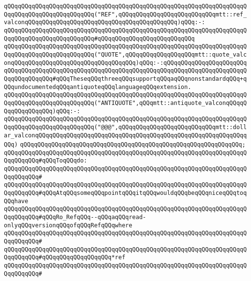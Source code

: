 \verb|qQQqqQQqqQQqqQQqqQQqqQQqqQQqqQQqqQQqqQQqqQQqqQQqqQQqqQQqqQQqqQQqqQQqqQQqqQQqqQQqqQQqqQQqqQQqqQQq("REF",qQQqqQQqqQQqqQQqqQQqqQQqqQQqmtt::ref_valconqQQqqQQqqQQqqQQqqQQqqQQqqQQqqQQqqQQqqQQqqQQq)qQQq:-:|\newline
\verb|qQQqqQQqqQQqqQQqqQQqqQQqqQQqqQQqqQQqqQQqqQQqqQQqqQQqqQQqqQQqqQQqqQQqqQQqqQQqqQQqqQQqqQQqqQQqqQQq#qQQqqQQqqQQqqQQqqQQqqQQqqQQq|\newline
\verb|qQQqqQQqqQQqqQQqqQQqqQQqqQQqqQQqqQQqqQQqqQQqqQQqqQQqqQQqqQQqqQQqqQQqqQQqqQQqqQQqqQQqqQQqqQQqqQQq("QUOTE",qQQqqQQqqQQqqQQqqQQqmtt::quote_valconqQQqqQQqqQQqqQQqqQQqqQQqqQQqqQQqqQQq)qQQq:-:qQQqqQQqqQQqqQQqqQQqqQQqqQQqqQQqqQQqqQQqqQQqqQQqqQQqqQQqqQQqqQQqqQQqqQQqqQQqqQQqqQQqqQQqqQQqqQQqqQQqqQQqqQQq#qQQqTheseqQQqthreeqQQqsupportqQQqaqQQqnonstandardqQQq+qQQqundocumentedqQQqantiquoteqQQqlanguageqQQqextension.|\newline
\verb|qQQqqQQqqQQqqQQqqQQqqQQqqQQqqQQqqQQqqQQqqQQqqQQqqQQqqQQqqQQqqQQqqQQqqQQqqQQqqQQqqQQqqQQqqQQqqQQq("ANTIQUOTE",qQQqmtt::antiquote_valconqQQqqQQqqQQqqQQqqQQq)qQQq:-:|\newline
\verb|qQQqqQQqqQQqqQQqqQQqqQQqqQQqqQQqqQQqqQQqqQQqqQQqqQQqqQQqqQQqqQQqqQQqqQQqqQQqqQQqqQQqqQQqqQQqqQQq("@@@",qQQqqQQqqQQqqQQqqQQqqQQqqQQqmtt::dollar_valconqQQqqQQqqQQqqQQqqQQqqQQqqQQqqQQqqQQqqQQqqQQqqQQqqQQqqQQqqQQqqQQq)|\newline
\verb|qQQqqQQqqQQqqQQqqQQqqQQqqQQqqQQqqQQqqQQqqQQqqQQqqQQqqQQqqQQqqQQq;|\newline
\newline
\verb|qQQqqQQqqQQqqQQqqQQqqQQqqQQqqQQqqQQqqQQqqQQqqQQqqQQqqQQqqQQqqQQqqQQqqQQqqQQqqQQq#qQQqToqQQqdo:|\newline
\verb|qQQqqQQqqQQqqQQqqQQqqQQqqQQqqQQqqQQqqQQqqQQqqQQqqQQqqQQqqQQqqQQqqQQqqQQqqQQqqQQq#|\newline
\verb|qQQqqQQqqQQqqQQqqQQqqQQqqQQqqQQqqQQqqQQqqQQqqQQqqQQqqQQqqQQqqQQqqQQqqQQqqQQqqQQq#qQQqAtqQQqsomeqQQqpointqQQqitqQQqwouldqQQqbeqQQqniceqQQqtoqQQqhave|\newline
\verb|qQQqqQQqqQQqqQQqqQQqqQQqqQQqqQQqqQQqqQQqqQQqqQQqqQQqqQQqqQQqqQQqqQQqqQQqqQQqqQQq#qQQqRo_RefqQQq--qQQqaqQQqread-onlyqQQqversionqQQqofqQQqRefqQQqwhere|\newline
\verb|qQQqqQQqqQQqqQQqqQQqqQQqqQQqqQQqqQQqqQQqqQQqqQQqqQQqqQQqqQQqqQQqqQQqqQQqqQQqqQQq#|\newline
\verb|qQQqqQQqqQQqqQQqqQQqqQQqqQQqqQQqqQQqqQQqqQQqqQQqqQQqqQQqqQQqqQQqqQQqqQQqqQQqqQQq#qQQqqQQqqQQqqQQqqQQq*ref|\newline
\verb|qQQqqQQqqQQqqQQqqQQqqQQqqQQqqQQqqQQqqQQqqQQqqQQqqQQqqQQqqQQqqQQqqQQqqQQqqQQqqQQq#|\newline
